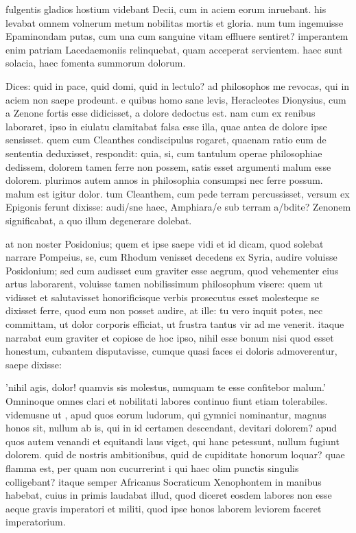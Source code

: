  fulgentis gladios hostium videbant Decii, cum in aciem eorum inruebant. his levabat omnem volnerum metum nobilitas mortis et gloria. num tum ingemuisse Epaminondam putas, cum una cum sanguine vitam effluere sentiret? imperantem enim patriam Lacedaemoniis relinquebat, quam acceperat servientem. haec sunt solacia, haec fomenta summorum dolorum.

 Dices: quid in pace, quid domi, quid in lectulo? ad philosophos me revocas, qui in aciem non saepe prodeunt. e quibus homo sane levis, Heracleotes Dionysius, cum a Zenone fortis esse didicisset, a dolore dedoctus est. nam cum ex renibus laboraret, ipso in eiulatu clamitabat falsa esse illa, quae antea de dolore ipse sensisset. quem cum Cleanthes condiscipulus rogaret, quaenam ratio eum de sententia deduxisset, respondit: quia, si, cum tantulum operae philosophiae dedissem, dolorem tamen ferre non possem, satis esset argumenti malum esse dolorem. plurimos autem annos in philosophia consumpsi nec ferre possum. malum est igitur dolor. tum Cleanthem, cum pede terram percussisset, versum ex Epigonis ferunt dixisse: audi/sne haec, Amphiara/e sub terram a/bdite? Zenonem significabat, a quo illum degenerare dolebat.

 at non noster Posidonius; quem et ipse saepe vidi et id dicam, quod solebat narrare Pompeius, se, cum Rhodum venisset decedens ex Syria, audire voluisse Posidonium; sed cum audisset eum graviter esse aegrum, quod vehementer eius artus laborarent, voluisse tamen nobilissimum philosophum visere: quem ut vidisset et salutavisset honorificisque verbis prosecutus esset molesteque se dixisset ferre, quod eum non posset audire, at ille: tu vero inquit potes, nec committam, ut dolor corporis efficiat, ut frustra tantus vir ad me venerit. itaque narrabat eum graviter et copiose de hoc ipso, nihil esse bonum nisi quod esset honestum, cubantem disputavisse, cumque quasi faces ei doloris admoverentur, saepe dixisse:

 'nihil agis, dolor! quamvis sis molestus, numquam te esse confitebor malum.' Omninoque omnes clari et nobilitati labores continuo fiunt etiam tolerabiles. videmusne ut , apud quos eorum ludorum, qui gymnici nominantur, magnus honos sit, nullum ab is, qui in id certamen descendant, devitari dolorem? apud quos autem venandi et equitandi laus viget, qui hanc petessunt, nullum fugiunt dolorem. quid de nostris ambitionibus, quid de cupiditate honorum loquar? quae flamma est, per quam non cucurrerint i qui haec olim punctis singulis colligebant? itaque semper Africanus Socraticum Xenophontem in manibus habebat, cuius in primis laudabat illud, quod diceret eosdem labores non esse aeque gravis imperatori et militi, quod ipse honos laborem leviorem faceret imperatorium.

